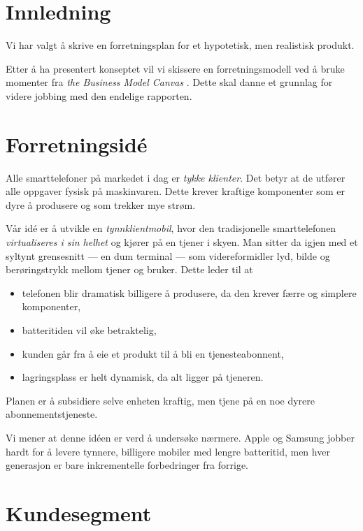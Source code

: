 \section{Innledning}

Vi har valgt å skrive en forretningsplan for et hypotetisk, men realistisk
produkt.

Etter å ha presentert konseptet vil vi skissere en forretningsmodell ved å
bruke momenter fra \textit{the Business Model Canvas} \cite{osterwalder}. Dette
skal danne et grunnlag for videre jobbing med den endelige rapporten.

\section{Forretningsidé}

Alle smarttelefoner på markedet i dag er \textit{tykke klienter}. Det betyr at
de utfører alle oppgaver fysisk på maskinvaren. Dette krever kraftige
komponenter som er dyre å produsere og som trekker mye strøm.

Vår idé er å utvikle en \textit{tynnklientmobil}, hvor den tradisjonelle
smarttelefonen \textit{virtualiseres i sin helhet} og kjører på en tjener i
skyen. Man sitter da igjen med et syltynt grensesnitt --- en dum terminal ---
som videreformidler lyd, bilde og berøringstrykk mellom tjener og bruker. Dette
leder til at

\begin{itemize}
  \item telefonen blir dramatisk billigere å produsere, da den krever færre og
    simplere komponenter,
  \item batteritiden vil øke betraktelig,
  \item kunden går fra å eie et produkt til å bli en tjenesteabonnent,
  \item lagringsplass er helt dynamisk, da alt ligger på tjeneren.
\end{itemize}

Planen er å subsidiere selve enheten kraftig, men tjene på en noe dyrere
abonnementstjeneste.

Vi mener at denne idéen er verd å undersøke nærmere. Apple og Samsung jobber
hardt for å levere tynnere, billigere mobiler med lengre batteritid, men hver
generasjon er bare inkrementelle forbedringer fra forrige.

\section{Kundesegment}

